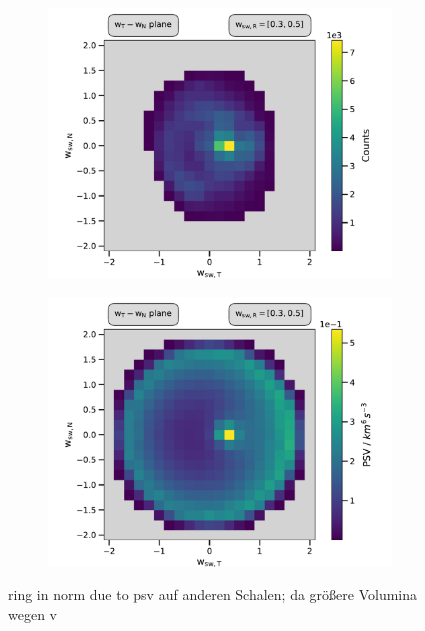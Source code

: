 \begin{figure}
	\centering
	\begin{subfigure}{.5\textwidth}
		\centering
		\includegraphics[width=1\textwidth]{Figures/cart_50_counts_R.pdf}
	\end{subfigure}%
	\begin{subfigure}{.5\textwidth}
		\centering
		\includegraphics[width=1\textwidth]{Figures/cart_50_norm_R.pdf}
	\end{subfigure}
	\caption{ring in norm due to psv auf anderen Schalen; da größere Volumina wegen v}
	\label{fig:counts_norm_50}
\end{figure}



